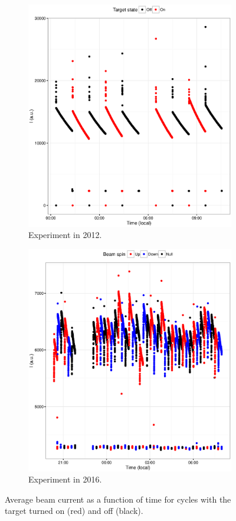 \documentclass[reprint]{revtex4-1}
\newcommand{\scl}{.4}
\begin{document}
\begin{figure}[h]
\begin{subfigure}{.5\textwidth}
\includegraphics[scale=\scl]{img/Cycles2012.eps}
\caption{Experiment in 2012.\label{fig:Cycs2012}}
\end{subfigure}
\begin{subfigure}{.5\textwidth}
\includegraphics[scale=\scl]{img/Cycles2016.eps}
\caption{Experiment in 2016.\label{fig:Cycs2016}}
\end{subfigure} 
\caption{Average beam current as a function of time for cycles with the target turned on (red) and off (black).}
\end{figure} 
\end{document}
